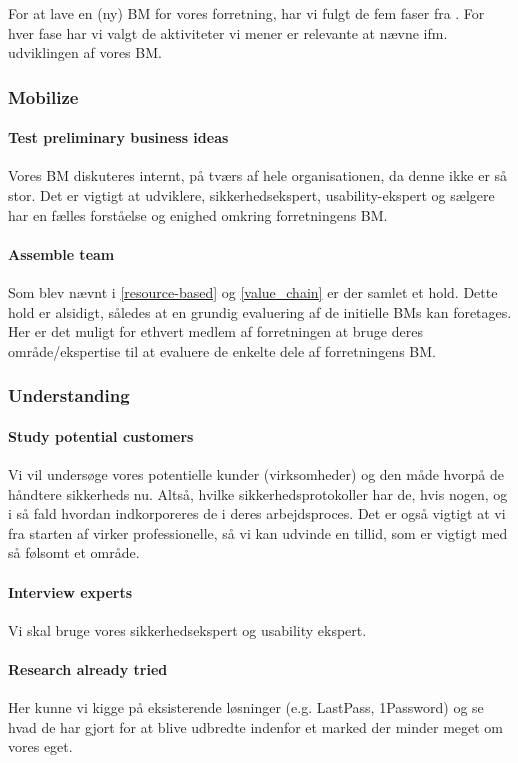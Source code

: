 For at lave en (ny) BM for vores forretning, har vi fulgt de fem faser fra \citet[pp. 244-259]{osterwalder2009business}.
For hver fase har vi valgt de aktiviteter vi mener er relevante at nævne ifm. udviklingen af vores BM.

\subsubsection{Mobilize}
\paragraph{Test preliminary business ideas}
Vores BM diskuteres internt, på tværs af hele organisationen, da denne ikke er så stor.
Det er vigtigt at udviklere, sikkerhedsekspert, usability-ekspert og sælgere har en fælles forståelse og enighed omkring forretningens BM.

\paragraph{Assemble team}
Som blev nævnt i \cref{resource-based} og \cref{value_chain} er der samlet et hold.
Dette hold er alsidigt, således at en grundig evaluering af de initielle BMs kan foretages.
Her er det muligt for ethvert medlem af forretningen at bruge deres område/ekspertise til at evaluere de enkelte dele af forretningens BM.

\subsubsection{Understanding}
\paragraph{Study potential customers}
Vi vil undersøge vores potentielle kunder (virksomheder) og den måde hvorpå de håndtere sikkerheds nu.
Altså, hvilke sikkerhedsprotokoller har de, hvis nogen, og i så fald hvordan indkorporeres de i deres arbejdsproces.
Det er også vigtigt at vi fra starten af virker professionelle, så vi kan udvinde en tillid, som er vigtigt med så følsomt et område.

\paragraph{Interview experts}
Vi skal bruge vores sikkerhedsekspert og usability ekspert.
\paragraph{Research already tried}
Her kunne vi kigge på eksisterende løsninger (e.g. LastPass, 1Password) og se hvad de har gjort for at blive udbredte indenfor et marked der minder meget om vores eget.

